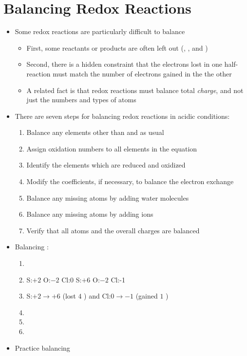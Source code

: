 \documentclass[12pt, openany, letterpaper]{memoir}
\begin{document}
\section{Balancing Redox Reactions}
\begin{itemize}
	\item Some redox reactions are particularly difficult to balance
	\begin{itemize}
		\item First, some reactants or products are often left out (, , and )
		\item Second, there is a hidden constraint that the electrons lost in one half-reaction must match the number of electrons gained in the the other
		\item A related fact is that redox reactions must balance total \emph{charge}, and not just the numbers and types of atoms
	\end{itemize}
	\item There are seven steps for balancing redox reactions in acidic conditions: 
	\begin{enumerate}
		\item Balance any elements other than  and  as usual
		\item Assign oxidation numbers to all elements in the equation
		\item Identify the elements which are reduced and oxidized
		\item Modify the coefficients, if necessary, to balance the electron exchange
		\item Balance any missing  atoms by adding water molecules
		\item Balance any missing  atoms by adding  ions
		\item Verify that all atoms and the overall charges are balanced
	\end{enumerate}
	\item Balancing :
	\begin{enumerate}
		\item {}
		\item S:$+2$ \hspace{1em} O:$-2$ \hspace{1em} Cl:$0$ \ch{->} S:$+6$ \hspace{1em} O:$-2$ \hspace{1em} Cl:-1
		\item S:$+2\rightarrow +6$ (lost $4$ ) and Cl:$0\rightarrow -1$ (gained $1$ )
		\item {}
		\item {}
		\item {}
	\end{enumerate}
	\item Practice balancing 
	

\end{itemize}
\end{document}
